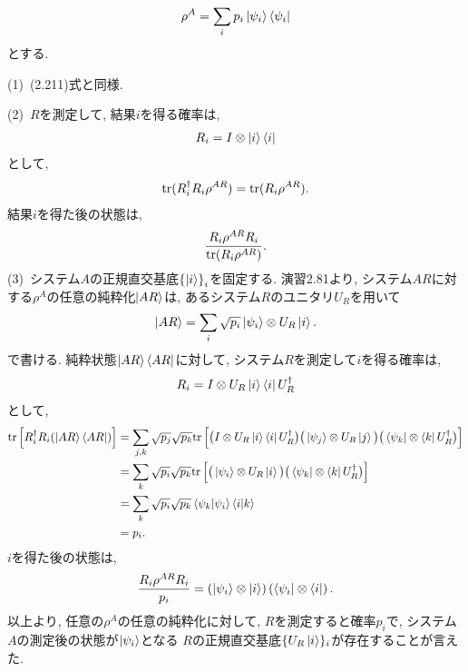 \begin{ex}
    \label{ex2.82}
    \begin{align*}
        \rho^A = \sum_i p_i \ket{\psi_i} \bra{\psi_i}
    \end{align*}
    とする. \par
    (1)\
    (2.211)式と同様.
    \par
    (2)\
    $R$を測定して, 結果$i$を得る確率は,
    \begin{align*}
        R_i = I \otimes \ket{i} \bra{i}
    \end{align*}
    として,
    \begin{align*}
        \mathrm{tr}(R_i^\dagger R_i \rho^{AR}) = \mathrm{tr}(R_i \rho^{AR}).
    \end{align*}
    結果$i$を得た後の状態は,
    \begin{align*}
        \frac{R_i \rho^{AR} R_i}{\mathrm{tr} (R_i \rho^{AR})}.
    \end{align*}
    (3)\
    システム$A$の正規直交基底$\left\{\ket{i}\right\}_i$を固定する.
    演習2.81より, 
    システム$AR$に対する$\rho^A$の任意の純粋化$\ket{AR}$は, あるシステム$R$のユニタリ$U_R$を用いて
    \begin{align*}
        \ket{AR} = \sum_i \sqrt{p_i} \ket{\psi_i} \otimes U_R \ket{i}.
    \end{align*}
    で書ける. 純粋状態$\ket{AR} \bra{AR}$に対して, システム$R$を測定して$i$を得る確率は,
    \begin{align*}
        R_i = I \otimes U_R \ket{i} \bra{i} U_R^\dagger
    \end{align*}
    として,
    \begin{align*}
        \mathrm{tr}\left[R_i^\dagger R_i ( \ket{AR} \bra{AR})\right]
         & =
        \sum_{j,k} \sqrt{p_j} \sqrt{p_k}
        \mathrm{tr}
        \left[
            \big(
            I \otimes U_R \ket{i}\bra{i} U_R^\dagger
            \big)
            \big(
            \ket{\psi_j} \otimes U_R\ket{j}
            \big)
            \big(
            \bra{\psi_k} \otimes \bra{k} U_R^\dagger
            \big)
            \right]
        \\
         & =
        \sum_{k} \sqrt{p_i} \sqrt{p_k}
        \mathrm{tr}
        \left[
            \big(
            \ket{\psi_i} \otimes U_R\ket{i}
            \big)
            \big(
            \bra{\psi_k} \otimes \bra{k} U_R^\dagger
            \big)
            \right]
        \\
         & =
        \sum_{k} \sqrt{p_i} \sqrt{p_k} \braket{\psi_k | \psi_i} \braket{i|k} \\
         & =
        p_i.
    \end{align*}
    $i$を得た後の状態は,
    \begin{align*}
        \frac{R_i \rho^{AR} R_i}{p_i}=
        \left(
        \ket{\psi_i} \otimes \ket{i}
        \right)
        \left(
        \bra{\psi_i} \otimes \bra{i}
        \right).
    \end{align*}
    以上より, 任意の$\rho^A$の任意の純粋化に対して,
    $R$を測定すると確率$p_i$で, システム$A$の測定後の状態が$\ket{\psi_i}$となる
    $R$の正規直交基底$\{ U_R \ket{i} \}_i$が存在することが言えた.
\end{ex}

